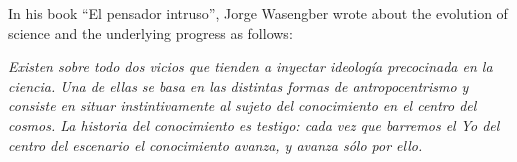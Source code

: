 In his book ``El pensador intruso'', Jorge Wasengber wrote about the evolution of science and the underlying progress as follows: 

\textit{Existen sobre todo dos vicios que tienden a inyectar ideología precocinada en la ciencia. Una de ellas se basa en las distintas formas de antropocentrismo y consiste en situar instintivamente al sujeto del conocimiento en el centro del cosmos. La historia del conocimiento es testigo: cada vez que barremos el Yo del centro del escenario el conocimiento avanza, y avanza sólo por ello.}



